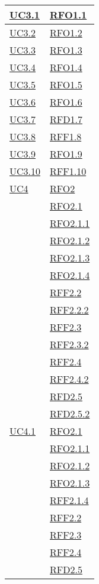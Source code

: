 \begin{longtable}{|>{\centering}m{5cm}|m{5cm}<{\centering}|}
\hyperlink{UC3.1}{UC3.1} & \hyperlink{RFO1.1}{RFO1.1}\\\hline
\hyperlink{UC3.2}{UC3.2} & \hyperlink{RFO1.2}{RFO1.2}\\\hline
\hyperlink{UC3.3}{UC3.3} & \hyperlink{RFO1.3}{RFO1.3}\\\hline
\hyperlink{UC3.4}{UC3.4} & \hyperlink{RFO1.4}{RFO1.4}\\\hline
\hyperlink{UC3.5}{UC3.5} & \hyperlink{RFO1.5}{RFO1.5}\\\hline
\hyperlink{UC3.6}{UC3.6} & \hyperlink{RFO1.6}{RFO1.6}\\\hline
\hyperlink{UC3.7}{UC3.7} & \hyperlink{RFD1.7}{RFD1.7}\\\hline
\hyperlink{UC3.8}{UC3.8} & \hyperlink{RFF1.8}{RFF1.8}\\\hline
\hyperlink{UC3.9}{UC3.9} & \hyperlink{RFO1.9}{RFO1.9}\\\hline
\hyperlink{UC3.10}{UC3.10} & \hyperlink{RFF1.10}{RFF1.10}\\\hline

\hyperlink{UC4}{UC4} 
& \hyperlink{RFO2}{RFO2}\\
& \hyperlink{RFO2.1}{RFO2.1}\\
& \hyperlink{RFO2.1.1}{RFO2.1.1}\\
& \hyperlink{RFO2.1.2}{RFO2.1.2}\\
& \hyperlink{RFO2.1.3}{RFO2.1.3}\\
& \hyperlink{RFO2.1.4}{RFO2.1.4}\\
& \hyperlink{RFF2.2}{RFF2.2}\\
& \hyperlink{RFF2.2.2}{RFF2.2.2}\\
& \hyperlink{RFF2.3}{RFF2.3}\\
& \hyperlink{RFF2.3.2}{RFF2.3.2}\\
& \hyperlink{RFF2.4}{RFF2.4}\\
& \hyperlink{RFF2.4.2}{RFF2.4.2}\\
& \hyperlink{RFF2.5}{RFD2.5}\\
& \hyperlink{RFF2.5.2}{RFD2.5.2}\\\hline


\hyperlink{UC4.1}{UC4.1} 
& \hyperlink{RFO2.1}{RFO2.1}\\
& \hyperlink{RFO2.1.1}{RFO2.1.1}\\
& \hyperlink{RFO2.1.2}{RFO2.1.2}\\
& \hyperlink{RFO2.1.3}{RFO2.1.3}\\
& \hyperlink{RFF2.1.4}{RFF2.1.4}\\
& \hyperlink{RFF2.2}{RFF2.2}\\
& \hyperlink{RFF2.3}{RFF2.3}\\
& \hyperlink{RFF2.4}{RFF2.4}\\
& \hyperlink{RFF2.5}{RFD2.5}\\\hline


\end{longtable}
